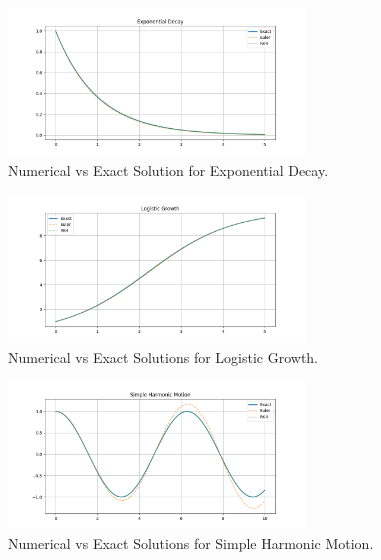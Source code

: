 \documentclass{article}
\begin{document}
\begin{center}
    \begin{figure}[htbp]
        \centering
        \includegraphics[width=0.7\textwidth]{results/figures/exponential_decay.png}
        \caption{Numerical vs Exact Solution for Exponential Decay.}
        \label{fig:exp_decay}
    \end{figure}
    
    \begin{figure}[htbp]
        \centering
        \includegraphics[width=0.7\textwidth]{results/figures/logistic_growth.png}
        \caption{Numerical vs Exact Solutions for Logistic Growth.}
        \label{fig:logistic_growth}
    \end{figure}
    
    \begin{figure}[htbp]
        \centering
        \includegraphics[width=0.7\textwidth]{results/figures/shm.png}
        \caption{Numerical vs Exact Solutions for Simple Harmonic Motion.}
        \label{fig:shm}
    \end{figure}
    

\end{center}
\end{document}

